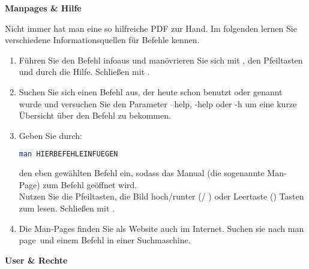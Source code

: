 \documentclass[paper=a4,fontsize=11pt]{scrartcl}%
\numberwithin{equation}{section}
\begin{document}
{\begin{center}\Large{\textbf{Manpages \& Hilfe}}\end{center}\vskip0.25in
Nicht immer hat man eine so hilfreiche PDF zur Hand. Im folgenden lernen Sie verschiedene Informationsquellen für Befehle kennen.
\begin{enumerate}
	\item Führen Sie den Befehl \glqq info\grqq aus und manövrieren Sie sich mit \keys{\tab}, den Pfeiltasten und \keys{\return} durch die Hilfe. Schließen mit .
	\item Suchen Sie sich einen Befehl aus, der heute schon benutzt oder genannt wurde und versuchen Sie den Parameter --help, -help oder -h um eine kurze Übersicht über den Befehl zu bekommen.
    \item Geben Sie durch: 
    \begin{lstlisting}[style=Bash, language=Bash]
man HIERBEFEHLEINFUEGEN
		\end{lstlisting}
		den eben gewählten Befehl ein, sodass das Manual (die sogenannte Man-Page) zum Befehl geöffnet wird.\\
		 Nutzen Sie die Pfeiltasten, die Bild hoch/runter (/ ) oder Leertaste (\keys{\Space}) Tasten zum lesen. Schließen mit .
		\item Die Man-Pages finden Sie als Website auch im Internet. Suchen sie nach \glqq man page\grqq\ und einem Befehl in einer Suchmaschine.
\end{enumerate}
\begin{center}\Large{\textbf{User \& Rechte}}\end{center}\vskip0.25in
\begin{enumerate}


\end{enumerate}}
\end{document}
